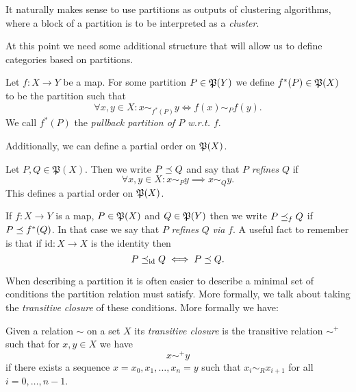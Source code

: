 It naturally makes sense to use partitions as outputs of clustering algorithms, where a block of a partition is to be interpreted as a \emph{cluster}.

At this point we need some additional structure that will allow us to define categories based on partitions.

\begin{definition}{}{}
Let $f: X \to Y$ be a map. For some partition $P \in \P(Y)$ we define $f^*(P) \in \P(X)$ to be the partition such that
\begin{equation*}
    \forall x,y \in X: x \sim_{f^*(P)} y \iff f(x) \sim_P f(y).
\end{equation*}
We call $f^*(P)$ the \emph{pullback partition of $P$ w.r.t. $f$}.
\end{definition}

Additionally, we can define a partial order on $\P(X)$.

\begin{definition}{}{}
Let $P, Q \in \mathfrak{P}(X)$. Then we write $P \refines Q$ and say that $P$ \emph{refines} $Q$ if
\begin{equation*}
    \forall x,y \in X: x \sim_P y \implies x \sim_Q y.
\end{equation*}
This defines a partial order on $\P(X)$.
\end{definition}
If $f: X \to Y$ is a map, $P \in \P(X)$ and $Q \in \P(Y)$ then we write $P \refines_f Q$ if $P \refines f^*(Q)$. In that case we say that $P$ \emph{refines} $Q$ \emph{via} $f$. A useful fact to remember is that if $\mathrm{id}: X \to X$ is the identity then
\begin{equation}
    \label{eq:refinement_via_identity}
    P \refines_{\mathrm{id}} Q \iff P \refines Q.
\end{equation}

When describing a partition it is often easier to describe a minimal set of conditions the partition relation must satisfy. More formally, we talk about taking the \emph{transitive closure} of these conditions. More formally we have:

\begin{definition}{}{}
    Given a relation $\sim$ on a set $X$ its \emph{transitive closure} is the transitive relation $\sim^+$ such that for $x,y \in X$ we have
    $$
    x \sim^+ y
    $$
    if there exists a sequence $x = x_0, x_1, \dots, x_n = y$ such that $x_i \sim_R x_{i+1}$ for all $i = 0, \dots, n-1$.
\end{definition}

